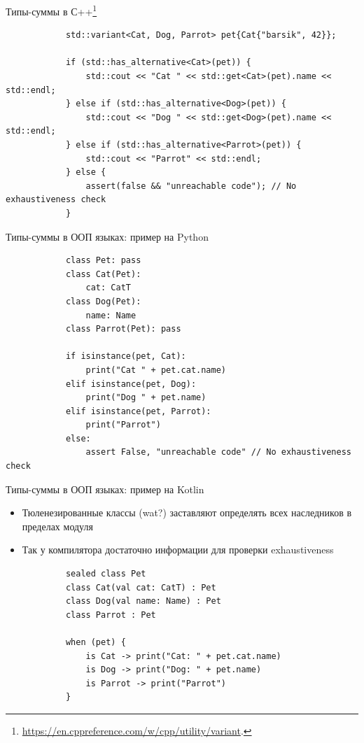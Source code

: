     \begin{frame}[fragile]{Типы-суммы в С++\footnote{\color{blue}\url{https://en.cppreference.com/w/cpp/utility/variant}.} \popslide}
        \begin{verbatim}
            std::variant<Cat, Dog, Parrot> pet{Cat{"barsik", 42}};

            if (std::has_alternative<Cat>(pet)) {
                std::cout << "Cat " << std::get<Cat>(pet).name << std::endl;
            } else if (std::has_alternative<Dog>(pet)) {
                std::cout << "Dog " << std::get<Dog>(pet).name << std::endl;
            } else if (std::has_alternative<Parrot>(pet)) {
                std::cout << "Parrot" << std::endl;
            } else {
                assert(false && "unreachable code"); // No exhaustiveness check
            }
        \end{verbatim}
    \end{frame}

    \begin{frame}[fragile]{Типы-суммы в ООП языках: пример на Python \popslide}
        \begin{verbatim}
            class Pet: pass
            class Cat(Pet):
                cat: CatT
            class Dog(Pet):
                name: Name
            class Parrot(Pet): pass

            if isinstance(pet, Cat):
                print("Cat " + pet.cat.name)
            elif isinstance(pet, Dog):
                print("Dog " + pet.name)
            elif isinstance(pet, Parrot):
                print("Parrot")
            else:
                assert False, "unreachable code" // No exhaustiveness check
        \end{verbatim}
    \end{frame}

    \begin{frame}[fragile]{Типы-суммы в ООП языках: пример на Kotlin \popslide}
        \begin{itemize}
            \item Тюленезированные классы (wat?) заставляют определять всех наследников в пределах модуля
            \item Так у компилятора достаточно информации для проверки exhaustiveness
        \end{itemize}
        \vspace{1em}
        \begin{verbatim}
            sealed class Pet
            class Cat(val cat: CatT) : Pet
            class Dog(val name: Name) : Pet
            class Parrot : Pet

            when (pet) {
                is Cat -> print("Cat: " + pet.cat.name)
                is Dog -> print("Dog: " + pet.name)
                is Parrot -> print("Parrot")
            }
        \end{verbatim}
    \end{frame}

